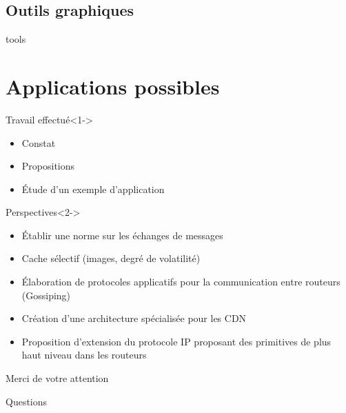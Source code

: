 \documentclass{beamer}
\begin{document}
\subsection{Outils graphiques}
\begin{frame}
    tools
\end{frame}


\section[Applications]{Applications possibles}
\begin{frame}
	\tableofcontents[currentsection]
\end{frame}

\begin{frame}

		\begin{block}{Travail effectué}<1->
		\begin{itemize}
			\item Constat%
			\item Propositions
			\item Étude d'un exemple d'application
		\end{itemize}
		\end{block}

		\begin{exampleblock}{Perspectives}<2->
		\begin{itemize}
			\item Établir une norme sur les échanges de messages
			\item Cache s\'electif (images, degr\'e de volatilit\'e)
			\item Élaboration de protocoles applicatifs pour la
				communication entre routeurs (Gossiping)
			\item Création d'une architecture spécialisée pour les CDN
			\item Proposition d'extension du protocole IP proposant
				des primitives de plus haut niveau dans les
				routeurs
		\end{itemize}
		\end{exampleblock}
\end{frame}

\begin{frame}
	\begin{center}	{\huge Merci de votre attention}\end{center}
	\end{frame}
\begin{frame}
	\begin{center}	{\huge Questions}\end{center}
	\end{frame}
\end{document}
